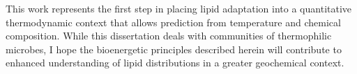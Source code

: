 
This work represents the first step in placing lipid adaptation into a quantitative thermodynamic context that allows prediction from temperature and chemical composition. While this dissertation deals with communities of thermophilic microbes, I hope the bioenergetic principles described herein will contribute to enhanced understanding of lipid distributions in a greater geochemical context.